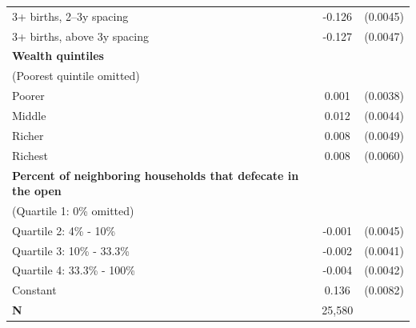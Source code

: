 {\begin{tabular}{l*{1}{cc}}
\hspace*{1em}3+ births, 2--3y spacing&      -0.126\sym{***}&    (0.0045)\\
\hspace*{1em}3+ births, above 3y spacing&      -0.127\sym{***}&    (0.0047)\\
\textbf{Wealth quintiles} \\ (Poorest quintile omitted)&                     &            \\
\hspace*{1em}Poorer              &       0.001         &    (0.0038)\\
\hspace*{1em}Middle              &       0.012\sym{**} &    (0.0044)\\
\hspace*{1em}Richer              &       0.008         &    (0.0049)\\
\hspace*{1em}Richest             &       0.008         &    (0.0060)\\
\textbf{Percent of neighboring households that defecate in the open} \\ (Quartile 1: 0\% omitted)&                     &            \\
\hspace*{1em}Quartile 2: 4\% - 10\%&      -0.001         &    (0.0045)\\
\hspace*{1em}Quartile 3: 10\% - 33.3\%&      -0.002         &    (0.0041)\\
\hspace*{1em}Quartile 4: 33.3\% - 100\%&      -0.004         &    (0.0042)\\
\hspace*{1em}Constant            &       0.136\sym{***}&    (0.0082)\\
\midrule
\textbf{N}          &      25,580         &            \\
\bottomrule
\end{tabular}
}
